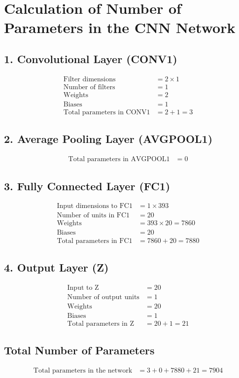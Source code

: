 \documentclass{article}
\begin{document}
	
	\section*{Calculation of Number of Parameters in the CNN Network}
	
	\subsection*{1. Convolutional Layer (CONV1)}
	\begin{align*}
		\text{Filter dimensions} &= 2 \times 1 \\
		\text{Number of filters} &= 1 \\
		\text{Weights} &= 2 \\
		\text{Biases} &= 1 \\
		\text{Total parameters in CONV1} &= 2 + 1 = 3
	\end{align*}
	
	\subsection*{2. Average Pooling Layer (AVGPOOL1)}
	\begin{align*}
		\text{Total parameters in AVGPOOL1} &= 0
	\end{align*}
	
	\subsection*{3. Fully Connected Layer (FC1)}
	\begin{align*}
		\text{Input dimensions to FC1} &= 1 \times 393 \\
		\text{Number of units in FC1} &= 20 \\
		\text{Weights} &= 393 \times 20 = 7860 \\
		\text{Biases} &= 20 \\
		\text{Total parameters in FC1} &= 7860 + 20 = 7880
	\end{align*}
	
	\subsection*{4. Output Layer (Z)}
	\begin{align*}
		\text{Input to Z} &= 20 \\
		\text{Number of output units} &= 1 \\
		\text{Weights} &= 20 \\
		\text{Biases} &= 1 \\
		\text{Total parameters in Z} &= 20 + 1 = 21
	\end{align*}
	
	\subsection*{Total Number of Parameters}
	\begin{align*}
		\text{Total parameters in the network} &= 3 + 0 + 7880 + 21 = 7904
	\end{align*}
	
\end{document}
